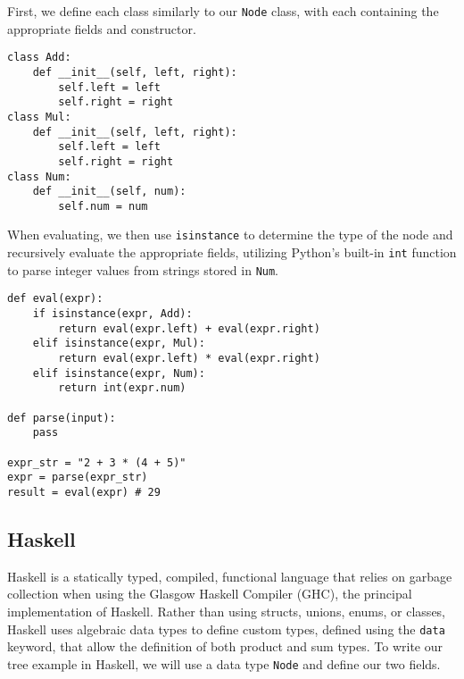 \documentclass[12pt, letterpaper]{article}
\begin{document}
First, we define each class similarly to our \texttt{Node} class, with each containing the appropriate fields and constructor.
\begin{verbatim}
class Add:
    def __init__(self, left, right):
        self.left = left
        self.right = right
class Mul:
    def __init__(self, left, right):
        self.left = left
        self.right = right
class Num:
    def __init__(self, num):
        self.num = num
\end{verbatim}
When evaluating, we then use \texttt{isinstance} to determine the type of the node and recursively evaluate the appropriate fields, utilizing Python's built-in \texttt{int} function to parse integer values from strings stored in \texttt{Num}.\autocite{python-functions}
\begin{verbatim}
def eval(expr):
    if isinstance(expr, Add):
        return eval(expr.left) + eval(expr.right)
    elif isinstance(expr, Mul):
        return eval(expr.left) * eval(expr.right)
    elif isinstance(expr, Num):
        return int(expr.num)

def parse(input):
    pass

expr_str = "2 + 3 * (4 + 5)"
expr = parse(expr_str)
result = eval(expr) # 29
\end{verbatim}

\subsection{Haskell}
Haskell is a statically typed, compiled, functional language that relies on garbage collection when using the Glasgow Haskell Compiler (GHC), the principal implementation of Haskell.\autocite[\S~5.7]{ghc} Rather than using structs, unions, enums, or classes, Haskell uses algebraic data types to define custom types, defined using the \texttt{data} keyword, that allow the definition of both product and sum types. To write our tree example in Haskell, we will use a data type \texttt{Node} and define our two fields.\autocite[\href{https://www.haskell.org/onlinereport/haskell2010/haskellch4.html}{chap.~4}]{haskell-report}
\end{document}
